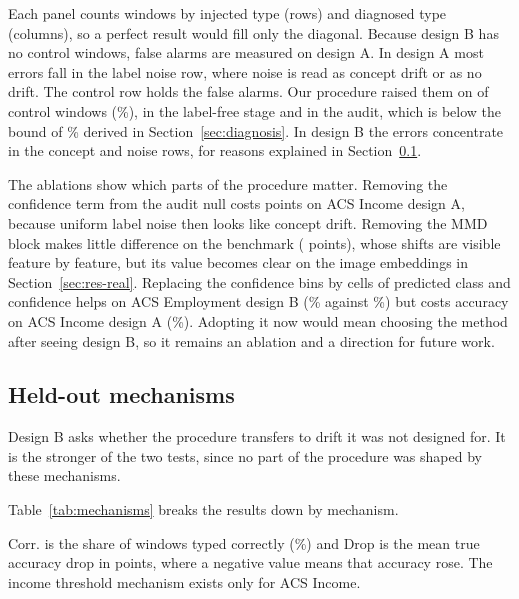 \documentclass[10pt]{article}
\newcommand{\keep}[1]{\needspace{#1\baselineskip}}
\begin{document}
Each panel counts windows by injected type (rows) and diagnosed type (columns), so a perfect result would fill only the diagonal. Because design B has no control windows, false alarms are measured on design A. In design A most errors fall in the label noise row, where noise is read as concept drift or as no drift. The control row holds the false alarms. Our procedure raised them on  of  control windows (\%),  in the label-free stage and  in the audit, which is below the bound of \% derived in Section~\ref{sec:diagnosis}. In design B the errors concentrate in the concept and noise rows, for reasons explained in Section~\ref{sec:res-mechanisms}.

The ablations show which parts of the procedure matter. Removing the confidence term from the audit null costs  points on ACS Income design A, because uniform label noise then looks like concept drift. Removing the MMD block makes little difference on the benchmark ( points), whose shifts are visible feature by feature, but its value becomes clear on the image embeddings in Section~\ref{sec:res-real}. Replacing the confidence bins by cells of predicted class and confidence helps on ACS Employment design B (\% against \%) but costs accuracy on ACS Income design A (\%). Adopting it now would mean choosing the method after seeing design B, so it remains an ablation and a direction for future work.

\keep{6}\subsection{Held-out mechanisms}
\label{sec:res-mechanisms}
Design B asks whether the procedure transfers to drift it was not designed for. It is the stronger of the two tests, since no part of the procedure was shaped by these mechanisms.

\keep{15}Table~\ref{tab:mechanisms} breaks the results down by mechanism.

\begin{table}[H]
\centering
\caption{Design B results by drift mechanism}
\label{tab:mechanisms}

\end{table}

Corr. is the share of windows typed correctly (\%) and Drop is the mean true accuracy drop in points, where a negative value means that accuracy rose. The income threshold mechanism exists only for ACS Income.
\end{document}

